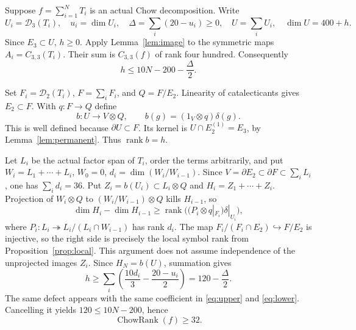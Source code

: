 \documentclass[11pt]{amsart}
\theoremstyle{remark}\newtheorem{remark}[theorem]{Remark}
\numberwithin{equation}{section}
\newcommand{\rank}{\operatorname{rank}}
\newcommand{\CR}{\operatorname{ChowRank}}
\newcommand{\cD}{\mathcal D}
\newcommand{\dd}{\partial}
\begin{document}
Suppose $f=\sum_{i=1}^N T_i$ is an actual Chow decomposition. Write
\[
 U_i=\cD_3(T_i),\quad u_i=\dim U_i,\quad
 \Delta=\sum_i(20-u_i)\ge0,\quad
 U=\sum_iU_i,\quad\dim U=400+h.
\]
Since $E_3\subset U$, $h\ge0$. Apply Lemma~\ref{lem:image} to the
symmetric maps $A_i=C_{3,3}(T_i)$. Their sum is $C_{3,3}(f)$ of rank
four hundred. Consequently
\begin{equation}\label{eq:upper}
 h\le10N-200-\frac{\Delta}{2}.
\end{equation}

Set $F_i=\cD_2(T_i)$, $F=\sum_iF_i$, and $Q=F/E_2$.
Linearity of catalecticants gives $E_2\subset F$.
With $q:F\to Q$ define
\[
 b:U\longrightarrow V\otimes Q,\qquad
 b(g)=(1_V\otimes q)\delta(g).
\]
This is well defined because $\dd U\subset F$. Its kernel is
$U\cap E_2^{(1)}=E_3$, by Lemma~\ref{lem:permanent}. Thus $\rank b=h$.

Let $L_i$ be the actual factor span of $T_i$, order the terms arbitrarily,
and put $W_i=L_1+\cdots+L_i$, $W_0=0$, $d_i=\dim(W_i/W_{i-1})$.
Since $V=\dd E_2\subset\dd F\subset\sum_iL_i$, one has
$\sum_i d_i=36$. Put $Z_i=b(U_i)\subset L_i\otimes Q$ and
$H_i=Z_1+\cdots+Z_i$. Projection of $W_i\otimes Q$ to
$(W_i/W_{i-1})\otimes Q$ kills $H_{i-1}$, so
\[
 \dim H_i-\dim H_{i-1}\ge
 \rank\bigl((P_i\otimes q|_{F_i})\delta|_{U_i}\bigr),
\]
where $P_i:L_i\twoheadrightarrow L_i/(L_i\cap W_{i-1})$ has rank $d_i$.
The map $F_i/(F_i\cap E_2)\hookrightarrow F/E_2$ is injective, so the
right side is precisely the local symbol rank from
Proposition~\ref{prop:local}. This argument does not assume independence
of the unprojected images $Z_i$.
Since $H_N=b(U)$, summation gives
\begin{equation}\label{eq:lower}
 h\ge\sum_i\left(\frac{10d_i}{3}-\frac{20-u_i}{2}\right)
   =120-\frac{\Delta}{2}.
\end{equation}
The same defect appears with the same coefficient in \eqref{eq:upper}
and \eqref{eq:lower}. Cancelling it yields $120\le10N-200$, hence
\[
 \CR(f)\ge32.
\]
\end{document}
